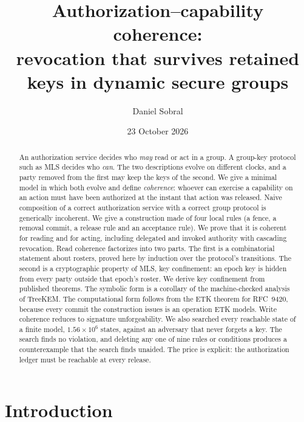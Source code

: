 \documentclass[aps,prx,reprint,superscriptaddress,nofootinbib,floatfix]{revtex4-2}
\theoremstyle{remark}
\begin{document}
\title{Authorization--capability coherence:\\ revocation that survives retained keys in dynamic secure groups}

\author{Daniel Sobral}

\date{23 October 2026}

\begin{abstract}
An authorization service decides who \emph{may} read or act in a group. A group-key protocol such as MLS decides who \emph{can}. The two descriptions evolve on different clocks, and a party removed from the first may keep the keys of the second. We give a minimal model in which both evolve and define \emph{coherence}: whoever can exercise a capability on an action must have been authorized at the instant that action was released. Naive composition of a correct authorization service with a correct group protocol is generically incoherent. We give a construction made of four local rules (a fence, a removal commit, a release rule and an acceptance rule). We prove that it is coherent for reading and for acting, including delegated and invoked authority with cascading revocation. Read coherence factorizes into two parts. The first is a combinatorial statement about rosters, proved here by induction over the protocol's transitions. The second is a cryptographic property of MLS, key confinement: an epoch key is hidden from every party outside that epoch's roster. We derive key confinement from published theorems. The symbolic form is a corollary of the machine-checked analysis of TreeKEM. The computational form follows from the ETK theorem for RFC~9420, because every commit the construction issues is an operation ETK models. Write coherence reduces to signature unforgeability. We also searched every reachable state of a finite model, $1.56\times10^6$ states, against an adversary that never forgets a key. The search finds no violation, and deleting any one of nine rules or conditions produces a counterexample that the search finds unaided. The price is explicit: the authorization ledger must be reachable at every release.
\end{abstract}

\maketitle

\section{Introduction}
\end{document}
